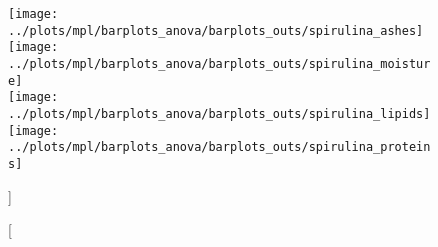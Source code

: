 
\begin{figure}[H]
\centering
		{\texttt{[image: ../plots/mpl/barplots\_anova/barplots\_outs/spirulina\_ashes]}}%
\hfill
		{\texttt{[image: ../plots/mpl/barplots\_anova/barplots\_outs/spirulina\_moisture]}}%
\\[\vbtwsfig]
		{\texttt{[image: ../plots/mpl/barplots\_anova/barplots\_outs/spirulina\_lipids]}}%
\hfill
		{\texttt{[image: ../plots/mpl/barplots\_anova/barplots\_outs/spirulina\_proteins]}}%
\caption%
[]%
{ }
\label{fig:}
\end{figure}
